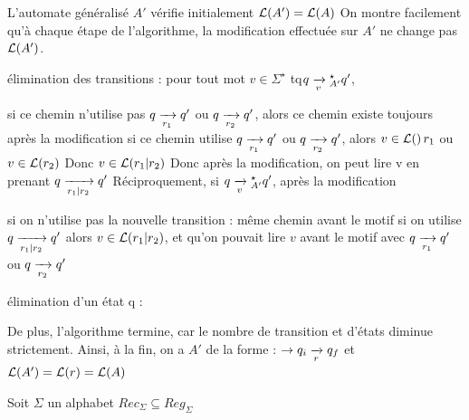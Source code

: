     \begin{nproof}
        \begin{enumerate}
            \itt L'automate généralisé $A'$ vérifie initialement $\mathcal{L}\!\left(A'\right) = \mathcal{L}\!\left(A\right)$
            \itt On montre facilement qu'à chaque étape de l'algorithme, la modification effectuée sur $A'$ ne change pas $\mathcal{L}\!\left(A'\right)$.
            \begin{enumerate}
                \itt élimination des transitions : pour tout mot $v \in \Sigma^\star$ tq$q \lima{v}{}_{A'}^\star q'$, 
                \begin{enumerate}
                    \itt si ce chemin n'utilise pas $q \lima{r_1}{} q'$ ou $q \lima{r_2}{}q'$, alors ce chemin existe toujours après la modification
                    \itt si ce chemin utilise $q \lima{r_1}{} q'$ ou $q \lima{r_2}{}q'$, alors $v \in \mathcal{L}\!\left(\right)r_1$ ou $v \in \mathcal{L}\!\left(r_2\right)$
                    Donc $v \in \mathcal{L}\!\left(r_1 \vert r_2\right)$
                    Donc après la modification, on peut lire v en prenant $q \lima{r_1 \vert r_2}{} q'$
                    \itt Réciproquement, si $q \lima{v}{}_{A'}^\star q'$, après la modification
                    \begin{enumerate}
                        \itt si on n'utilise pas la nouvelle transition : même chemin avant le motif
                        \itt si on utilise $q \lima{r_1 \vert r_2}{} q'$ alors $v \in \mathcal{L}\!\left(r_1 \vert r_2\right)$, et qu'on pouvait lire $v$ avant le motif avec $q \lima{r_1}{} q'$ ou $q \lima{r_2}{} q'$
                    \end{enumerate}
                \end{enumerate}
                \itt élimination d'un état q :
            \end{enumerate}
            \itt De plus, l'algorithme termine, car le nombre de transition et d'états diminue strictement. Ainsi, à la fin, on a  $A'$ de la forme : $\to q_i \lima{r}{} q_f$ et $\mathcal{L}\!\left(A'\right) = \mathcal{L}\!\left(r\right) = \mathcal{L}\!\left(A\right)$
        \end{enumerate}
    
    \end{nproof}
    
    \begin{corollary}{}{}
        Soit $\Sigma$ un alphabet 
        $Rec_\Sigma \subseteq Reg_\Sigma$
    \end{corollary}
    
